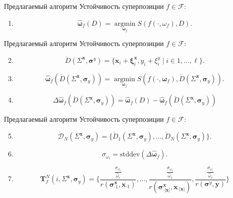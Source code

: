 \documentclass{beamer}
\begin{document}
\begin{frame}{Предлагаемый алгоритм}
  Устойчивость суперпозиции $f \in \mathcal{F}$:
  \begin{enumerate}
    \item \[
        \hat{\boldsymbol{\omega}}_f(D) = \mathop{\arg \min}\limits_{\boldsymbol{\omega}_f} S(f (\cdot, \omega_f), D).
      \]
  \end{enumerate}
\end{frame}

\begin{frame}{Предлагаемый алгоритм}
  Устойчивость суперпозиции $f \in \mathcal{F}$:
  \begin{enumerate}
    \setcounter{enumi}{1}
    \item \[
        \acute{D}(\Sigma^{\mathbf{x}}, \boldsymbol{\sigma}^y) = \{ \mathbf{x}_i + \boldsymbol{\xi}^{\mathbf{x}}_i, y_i + \xi^y_i \mid i \in 1, \dots, \ell \}.
      \]
    \item \[
    		\hat{\boldsymbol{\omega}}_f (\acute{D} (\Sigma^{\mathbf{x}}, \boldsymbol{\sigma}_y)) = \mathop{\arg \min}\limits_{\boldsymbol{\omega}_f} S (f (\cdot, \boldsymbol{\omega}_f), \acute{D} (\Sigma^{\mathbf{x}}, \boldsymbol{\sigma}_y)).
      \]
    \item \[
        \Delta\hat{\boldsymbol{\omega}}_f(\acute{D} (\Sigma^{\mathbf{x}}, \boldsymbol{\sigma}_y) ) = \hat{\boldsymbol{\omega}}_f(D) - \hat{\boldsymbol{\omega}}_f (\acute{D} (\Sigma^{\mathbf{x}}, \boldsymbol{\sigma}_y))
      \]
   \end{enumerate}
\end{frame}

\begin{frame}{Предлагаемый алгоритм}
  Устойчивость суперпозиции $f \in \mathcal{F}$:
  \begin{enumerate}
    \setcounter{enumi}{4}   
    \item \[
        \acute{\mathcal{D}}_N (\Sigma^{\mathbf{x}}, \boldsymbol{\sigma}_y) = \{ \acute{D}_1 (\Sigma^{\mathbf{x}}, \boldsymbol{\sigma}_y), \dots, \acute{D}_N (\Sigma^{\mathbf{x}}, \boldsymbol{\sigma}_y) \}.
      \]
    \item \[
        \sigma_{\omega_i} = \text{stddev} (\Delta\hat{\boldsymbol{\omega}}_f).
      \]
    \item \[
        \mathbf{T}^N_f(i, \Sigma^{\mathbf{x}}, \boldsymbol{\sigma}_y) = \Big\{ \frac{\frac{\sigma_{\omega_i}}{\hat{\omega}_i}}{r(\boldsymbol{\sigma}^\mathbf{x}_{\cdot 1}, \mathbf{x}_{\cdot 1})}, \dots, \frac{\frac{\sigma_{\omega_i}}{\hat{\omega}_i}}{r(\boldsymbol{\sigma}^\mathbf{x}_{\cdot |\mathbf{x}|}, \mathbf{x}_{\cdot |\mathbf{x}|})}, \frac{\frac{\sigma_{\omega_i}}{\hat{\omega}_i}}{r(\boldsymbol{\sigma}^y, \mathbf{y})} \Big\}
      \]
  \end{enumerate}
\end{frame}
\end{document}
